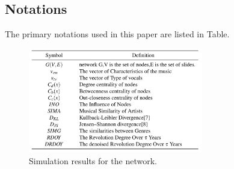 \documentclass[conference]{IEEEtran}
\begin{document}
\subsection{Notations}
The primary notations used in this paper are listed in Table.
\begin{figure}[h]
	\centering
	\includegraphics[width=3in]{./img/ttt}
	\caption{Simulation results for the network.}
\end{figure}
\end{document}
